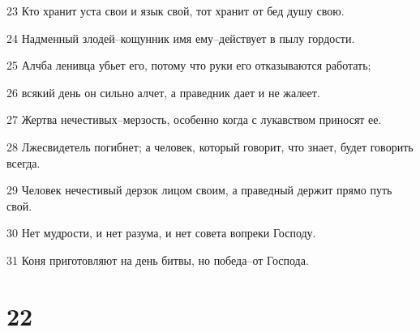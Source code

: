 \par 23 Кто хранит уста свои и язык свой, тот хранит от бед душу свою.
\par 24 Надменный злодей--кощунник имя ему--действует в пылу гордости.
\par 25 Алчба ленивца убьет его, потому что руки его отказываются работать;
\par 26 всякий день он сильно алчет, а праведник дает и не жалеет.
\par 27 Жертва нечестивых--мерзость, особенно когда с лукавством приносят ее.
\par 28 Лжесвидетель погибнет; а человек, который говорит, что знает, будет говорить всегда.
\par 29 Человек нечестивый дерзок лицом своим, а праведный держит прямо путь свой.
\par 30 Нет мудрости, и нет разума, и нет совета вопреки Господу.
\par 31 Коня приготовляют на день битвы, но победа--от Господа.

\chapter{22}

